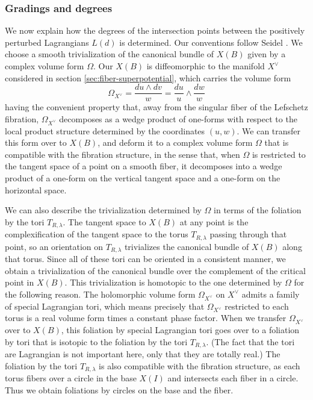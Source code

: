 \documentclass[12pt]{amsart}
\begin{document}


\subsubsection{Gradings and degrees}
\label{sec:gradings}

We now explain how the degrees of the intersection points between the positively perturbed Lagrangians $L(d)$ is determined. Our conventions follow Seidel \cite[\S 11]{seidel-book}. We choose a smooth trivialization of the canonical bundle of $X(B)$ given by a complex volume form $\Omega$. Our $X(B)$ is diffeomorphic to the manifold $X^\vee$ considered in section \ref{sec:fiber-superpotential}, which carries the volume form
\begin{equation}
  \Omega_{X^\vee} = \frac{du \wedge dv}{w} = \frac{du}{u} \wedge \frac{dw}{w}
\end{equation}
having the convenient property that, away from the singular fiber of the Lefschetz fibration, $\Omega_{X^\vee}$ decomposes as a wedge product of one-forms with respect to the local product structure determined by the coordinates $(u,w)$. We can transfer this form over to $X(B)$, and deform it to a complex volume form $\Omega$ that is compatible with the fibration structure, in the sense that, when $\Omega$ is restricted to the tangent space of a point on a smooth fiber, it decomposes into a wedge product of a one-form on the vertical tangent space and a one-form on the horizontal space.

 We can also describe the trivialization determined by $\Omega$ in terms of the foliation by the tori $T_{R,\lambda}$. The tangent space to $X(B)$ at any point is the complexification of the tangent space to the torus $T_{R,\lambda}$ passing through that point, so an orientation on $T_{R,\lambda}$ trivializes the canonical bundle of $X(B)$ along that torus. Since all of these tori can be oriented in a consistent manner, we obtain a trivialization of the canonical bundle over the complement of the critical point in $X(B)$. This trivialization is homotopic to the one determined by $\Omega$ for the following reason. The holomorphic volume form $\Omega_{X^\vee}$ on $X^\vee$ admits a family of special Lagrangian tori, which means precisely that $\Omega_{X^\vee}$ restricted to each torus is a real volume form times a constant phase factor. When we transfer $\Omega_{X^\vee}$ over to $X(B)$, this foliation by special Lagrangian tori goes over to a foliation by tori that is isotopic to the foliation by the tori $T_{R,\lambda}$. (The fact that the tori are Lagrangian is not important here, only that they are totally real.) The foliation by the tori $T_{R,\lambda}$ is also compatible with the fibration structure, as each torus fibers over a circle in the base $X(I)$ and intersects each fiber in a circle. Thus we obtain foliations by circles on the base and the fiber. 
\end{document}
